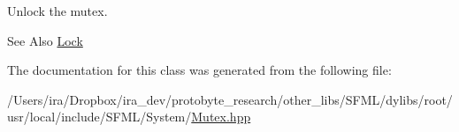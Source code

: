 Unlock the mutex. 

\begin{DoxySeeAlso}{See Also}
\hyperlink{classsf_1_1_lock}{Lock} 
\end{DoxySeeAlso}


The documentation for this class was generated from the following file\-:\begin{DoxyCompactItemize}
\item 
/\-Users/ira/\-Dropbox/ira\-\_\-dev/protobyte\-\_\-research/other\-\_\-libs/\-S\-F\-M\-L/dylibs/root/usr/local/include/\-S\-F\-M\-L/\-System/\hyperlink{_mutex_8hpp}{Mutex.\-hpp}\end{DoxyCompactItemize}
